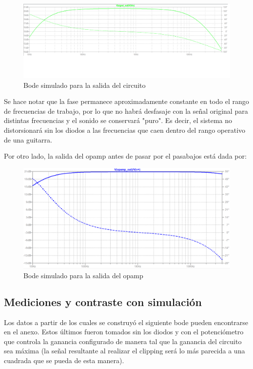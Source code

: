 \documentclass[../../main.tex]{subfiles}
\begin{document}
\begin{figure}[H]
	\includegraphics[scale=.4]{imagenes/Bode_simulacion.png}
	\caption{Bode simulado para la salida del circuito}
	\label{fig:ej5_Bode_simulacion}
\end{figure}
 
Se hace notar que la fase permanece aproximadamente constante en todo el rango de frecuencias de trabajo, por lo que no habrá desfasaje con la señal original para distintas frecuencias y el sonido se conservará "puro". Es decir, el sistema no distorsionará sin los diodos a las frecuencias que caen dentro del rango operativo de una guitarra.\par

Por otro lado, la salida del opamp antes de pasar por el pasabajos está dada por:
\begin{figure}[H]
	\centering
	\includegraphics[scale=.4]{imagenes/bode_opamp_simulacion_300mv.png}
	\caption{Bode simulado para la salida del opamp}
	\label{fig:ej5_bode_opamp_simulacion_300mv}
\end{figure}

\subsection{Mediciones y contraste con simulación}

Los datos a partir de los cuales se construyó el siguiente bode pueden encontrarse en el anexo. Estos últimos fueron tomados sin los diodos y con el potenciómetro que controla la ganancia configurado de manera tal que la ganancia del circuito sea máxima (la señal resultante al realizar el clipping será lo más parecida a una cuadrada que se pueda de esta manera).
\end{document}
